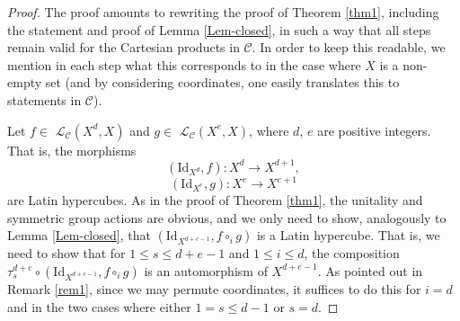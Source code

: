 \documentclass{amsart} %
\theoremstyle{plain}\newtheorem{Theorem}{Theorem}[section]
\theoremstyle{plain}\newtheorem{Conjecture}[Theorem]{Conjecture}
\theoremstyle{plain}\newtheorem{Corollary}[Theorem]{Corollary}
\theoremstyle{plain}\newtheorem{Lemma}[Theorem]{Lemma}
\theoremstyle{plain}\newtheorem{Proposition}[Theorem]{Proposition}
\theoremstyle{definition}\newtheorem{Definition}[Theorem]{Definition}
\theoremstyle{definition}\newtheorem{Example}[Theorem]{Example}
\theoremstyle{definition}\newtheorem{Examples}[Theorem]{Examples}
\theoremstyle{definition}\newtheorem{Remark}[Theorem]{Remark}
\theoremstyle{definition}\newtheorem{Remarks}[Theorem]{Remarks}
\theoremstyle{plain}\newtheorem{Statement}[Theorem]{}
\def\CC{{\mathcal{C}}}    \def\OP{{\mathcal{O}P}}
\def\CL{{\mathcal{L}}}  \def\bCL{{\mathbf{L}}}
\def\Id{\mathrm{Id}}             \def\tenA{\otimes_A}
\begin{document}
\begin{proof}
The proof amounts to rewriting the proof of Theorem \ref{thm1}, including the statement and proof of
Lemma \ref{Lem-closed}, in such a way
that all steps remain valid for the Cartesian products in $\CC$.  In order to keep
this readable, we mention in each step what this corresponds to in the case where
$X$ is a non-empty set (and by considering coordinates, one easily translates this
to statements in $\CC$). 

\medskip
Let $f\in$ $\CL_\CC(X^d,X)$ and $g\in$ $\CL_\CC(X^e,X)$, where
$d$, $e$ are positive integers. That is, the morphisms
$$(\Id_{X^d}, f) : X^d \to X^{d+1}, $$
$$(\Id_{X^e},g) : X^e \to X^{e+1}$$
are Latin hypercubes. 
As in the proof of Theorem \ref{thm1}, the unitality and symmetric group actions
are obvious, and we only need to show, analogously to Lemma \ref{Lem-closed}, 
that  $(\Id_{X^{d+e-1}}, f\circ_i g)$ is a Latin hypercube. That is, we need to show that for
$1\leq s\leq d+e-1$ and $1\leq i\leq d$, 
the composition $\tau^{d+e}_s \circ  (\Id_{X^{d+e-1}}, f\circ_i g)$
is an automorphism of $X^{d+e-1}$. As pointed out in Remark \ref{rem1}, since
we may permute coordinates, it suffices to do this for $i=d$ and  in the two cases where
either $1=s\leq d-1$ or $s=d$.


\end{proof}
\end{document}
